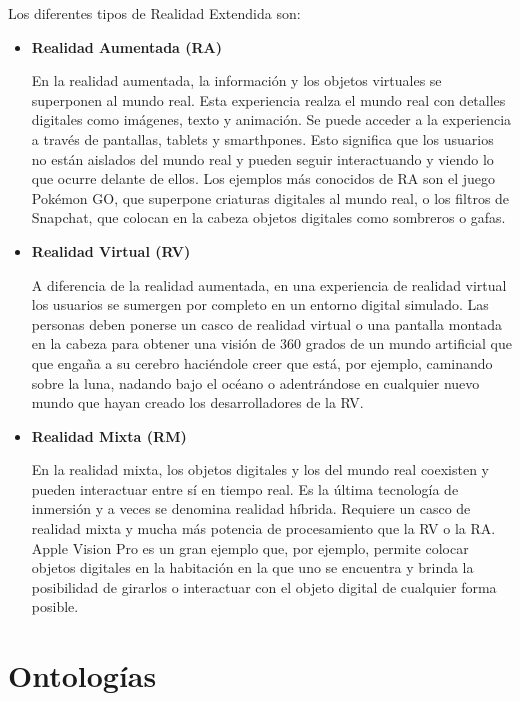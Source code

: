 
Los diferentes tipos de Realidad Extendida son:
\begin{itemize}
\item \textbf{Realidad Aumentada (\uppercase{RA})}

En la realidad aumentada, la información y los objetos virtuales se superponen al mundo real.
Esta experiencia realza el mundo real con detalles digitales como imágenes, texto y animación.
Se puede acceder a la experiencia a través de pantallas, tablets y smarthpones.
Esto significa que los usuarios no están aislados del mundo real y pueden seguir interactuando y viendo lo que ocurre delante de ellos. Los ejemplos más conocidos de RA son el juego Pokémon GO, que superpone criaturas digitales al mundo real, o los filtros de Snapchat, que colocan en la cabeza objetos digitales como sombreros o gafas.
\item \textbf{Realidad Virtual (\uppercase{RV})}

A diferencia de la realidad aumentada, en una experiencia de realidad virtual
los usuarios se sumergen por completo en un entorno digital simulado.
Las personas deben ponerse un casco de realidad virtual o una pantalla montada en la cabeza para obtener una visión de 360 grados de un mundo artificial que
que engaña a su cerebro haciéndole creer que está, por ejemplo, caminando sobre la luna, nadando bajo el océano o adentrándose en cualquier nuevo mundo que hayan creado los desarrolladores de la RV.

\item \textbf{Realidad Mixta (\uppercase{RM})}

En la realidad mixta, los objetos digitales y los del mundo real coexisten y pueden interactuar entre sí en tiempo real. Es la última tecnología de inmersión y a veces se denomina realidad híbrida.
Requiere un casco de realidad mixta y mucha más potencia de procesamiento que la RV o la RA. Apple Vision Pro es un gran ejemplo que, por ejemplo, permite colocar objetos digitales en la habitación en la que uno se encuentra y brinda la posibilidad de girarlos o interactuar con el objeto digital de cualquier forma posible.

\end{itemize}

\section{Ontologías}

